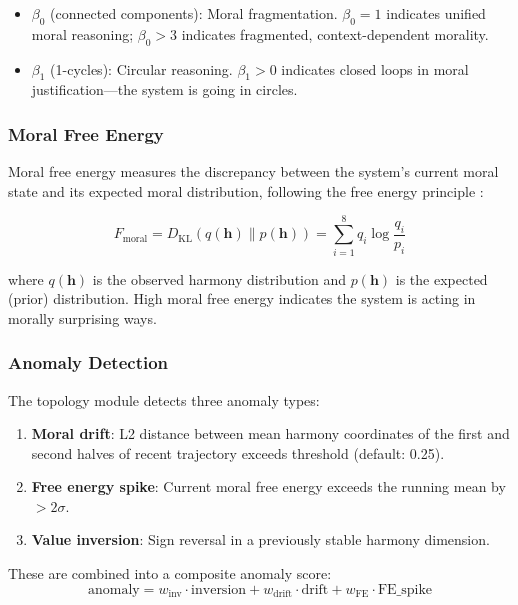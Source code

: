\documentclass[11pt,a4paper]{article}
\begin{document}
\begin{itemize}
  \item $\beta_0$ (connected components): Moral fragmentation. $\beta_0 = 1$ indicates unified moral reasoning; $\beta_0 > 3$ indicates fragmented, context-dependent morality.
  \item $\beta_1$ (1-cycles): Circular reasoning. $\beta_1 > 0$ indicates closed loops in moral justification---the system is going in circles.
\end{itemize}

\subsubsection{Moral Free Energy}

Moral free energy measures the discrepancy between the system's current moral state and its expected moral distribution, following the free energy principle \citep{friston2010}:

\begin{equation}
F_{\text{moral}} = D_{\text{KL}}(q(\mathbf{h}) \| p(\mathbf{h})) = \sum_{i=1}^{8} q_i \log \frac{q_i}{p_i}
\end{equation}

\noindent where $q(\mathbf{h})$ is the observed harmony distribution and $p(\mathbf{h})$ is the expected (prior) distribution. High moral free energy indicates the system is acting in morally surprising ways.

\subsubsection{Anomaly Detection}

The topology module detects three anomaly types:
\begin{enumerate}
  \item \textbf{Moral drift}: L2 distance between mean harmony coordinates of the first and second halves of recent trajectory exceeds threshold (default: 0.25).
  \item \textbf{Free energy spike}: Current moral free energy exceeds the running mean by $> 2\sigma$.
  \item \textbf{Value inversion}: Sign reversal in a previously stable harmony dimension.
\end{enumerate}

These are combined into a composite anomaly score:
\begin{equation}
\text{anomaly} = w_{\text{inv}} \cdot \text{inversion} + w_{\text{drift}} \cdot \text{drift} + w_{\text{FE}} \cdot \text{FE\_spike}
\end{equation}
\end{document}

